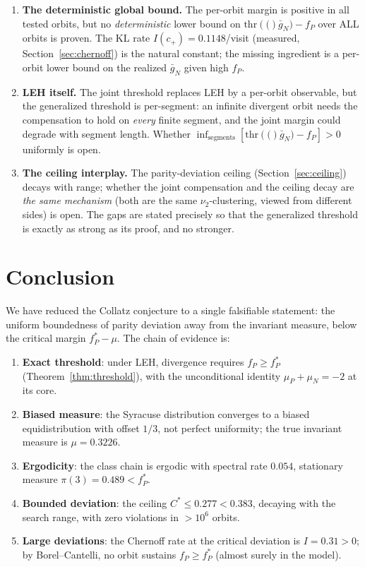 \documentclass[12pt,reqno]{amsart}
\theoremstyle{plain}
\theoremstyle{definition}
\newcommand{\nuTwo}{\nu_2}
\newcommand{\fP}{f_P}
\newcommand{\fPstar}{f_P^*}
\newcommand{\muP}{\mu_P}
\newcommand{\muN}{\mu_N}
\newcommand{\thr}[1]{\mathrm{thr}\!\left(#1\right)}
\begin{document}
\begin{enumerate}
\item \textbf{The deterministic global bound.} The per-orbit margin is
positive in all tested orbits, but no \emph{deterministic} lower bound on
$\thr(\bar g_N) - \fP$ over ALL orbits is proven. The KL rate
$I(c_+) = 0.1148$/visit (measured, Section~\ref{sec:chernoff}) is the natural
constant; the missing ingredient is a per-orbit lower bound on the realized
$\bar g_N$ given high $\fP$.
\item \textbf{LEH itself.} The joint threshold replaces LEH by a per-orbit
observable, but the generalized threshold is per-segment: an infinite divergent
orbit needs the compensation to hold on \emph{every} finite segment, and the
joint margin could degrade with segment length. Whether
$\inf_{\text{segments}} [\thr(\bar g_N) - \fP] > 0$ uniformly is open.
\item \textbf{The ceiling interplay.} The parity-deviation ceiling
(Section~\ref{sec:ceiling}) decays with range; whether the joint compensation
and the ceiling decay are \emph{the same mechanism} (both are the same
$\nuTwo$-clustering, viewed from different sides) is open.
The gaps are stated precisely so that the generalized threshold is exactly as
strong as its proof, and no stronger.
\end{enumerate}

\section{Conclusion}\label{sec:conclusion}

We have reduced the Collatz conjecture to a single falsifiable statement: the
uniform boundedness of parity deviation away from the invariant measure,
below the critical margin $\fPstar - \mu$. The chain of evidence is:

\begin{enumerate}
\item \textbf{Exact threshold}: under LEH, divergence requires $\fP \ge \fPstar$
      (Theorem~\ref{thm:threshold}), with the unconditional identity
      $\muP + \muN = -2$ at its core.
\item \textbf{Biased measure}: the Syracuse distribution converges to a biased
      equidistribution with offset $1/3$, not perfect uniformity; the true
      invariant measure is $\mu = 0.3226$.
\item \textbf{Ergodicity}: the class chain is ergodic with spectral rate $0.054$,
      stationary measure $\pi(3) = 0.489 < \fPstar$.
\item \textbf{Bounded deviation}: the ceiling $C^* \le 0.277 < 0.383$, decaying
      with the search range, with zero violations in $>10^6$ orbits.
\item \textbf{Large deviations}: the Chernoff rate at the critical deviation is
      $I = 0.31 > 0$; by Borel--Cantelli, no orbit sustains $\fP \ge \fPstar$
      (almost surely in the model).
\end{enumerate}
\end{document}
